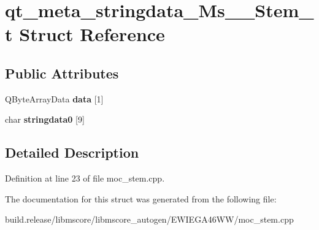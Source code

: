 \hypertarget{structqt__meta__stringdata___ms_____stem__t}{}\section{qt\+\_\+meta\+\_\+stringdata\+\_\+\+Ms\+\_\+\+\_\+\+Stem\+\_\+t Struct Reference}
\label{structqt__meta__stringdata___ms_____stem__t}
\subsection*{Public Attributes}
\begin{DoxyCompactItemize}
\item 
\mbox{\label{structqt__meta__stringdata___ms_____stem__t_a0541d6de49ab89504e28d3b24453428a}} 
Q\+Byte\+Array\+Data {\bfseries data} \mbox{[}1\mbox{]}
\item 
\mbox{\label{structqt__meta__stringdata___ms_____stem__t_a8ad6f51df40e68f5fc6b71470494f040}} 
char {\bfseries stringdata0} \mbox{[}9\mbox{]}
\end{DoxyCompactItemize}


\subsection{Detailed Description}


Definition at line 23 of file moc\+\_\+stem.\+cpp.



The documentation for this struct was generated from the following file\+:\begin{DoxyCompactItemize}
\item 
build.\+release/libmscore/libmscore\+\_\+autogen/\+E\+W\+I\+E\+G\+A46\+W\+W/moc\+\_\+stem.\+cpp\end{DoxyCompactItemize}
